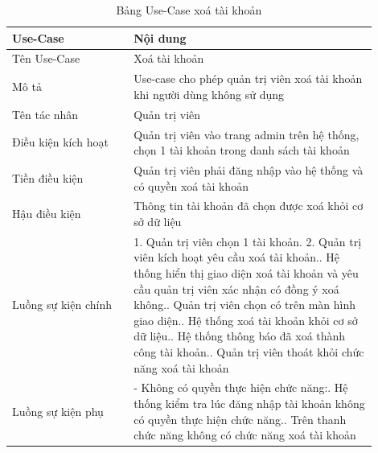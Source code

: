 \begin{longtable}[htp]{ |m{0.3\linewidth}|m{0.6\linewidth}|}
 \caption{Bảng Use-Case xoá tài khoản \label{long}}\\
 \hline
 Use-Case & Nội dung \\
 \hline
 Tên Use-Case & Xoá tài khoản \\
 \hline
 Mô tả & Use-case cho phép quản trị viên xoá tài khoản khi người dùng không sử dụng\\
 \hline
 Tên tác nhân & Quản trị viên\\
 \hline
 Điều kiện kích hoạt & Quản trị viên vào trang admin trên hệ thống, chọn 1 tài khoản trong danh sách tài khoản\\
 \hline
 Tiền điều kiện & Quản trị viên phải đăng nhập vào hệ thống và có quyền xoá tài khoản\\
 \hline
 Hậu điều kiện & Thông tin tài khoản đã chọn được xoá khỏi cơ sở dữ liệu\\
 \hline
 Luồng sự kiện chính & 
 1. Quản trị viên chọn 1 tài khoản.
 2. Quản trị viên kích hoạt yêu cầu xoá tài khoản.\newline
 3. Hệ thống hiển thị giao diện xoá tài khoản và yêu cầu quản trị viên xác nhận có đồng ý xoá không.\newline
 4. Quản trị viên chọn có trên màn hình giao diện.\newline
 5. Hệ thống xoá tài khoản khỏi cơ sở dữ liệu.\newline
 6. Hệ thống thông báo đã xoá thành công tài khoản.\newline	
 7. Quản trị viên thoát khỏi chức năng xoá tài khoản
 \\
 \hline
 Luồng sự kiện phụ & 
 - Không có quyền thực hiện chức năng:\newline
  1. Hệ thống kiểm tra lúc đăng nhập tài khoản không có quyền thực hiện chức năng.\newline
  2. Trên thanh chức năng không có chức năng xoá tài khoản
 \\
 \hline
\end{longtable}

